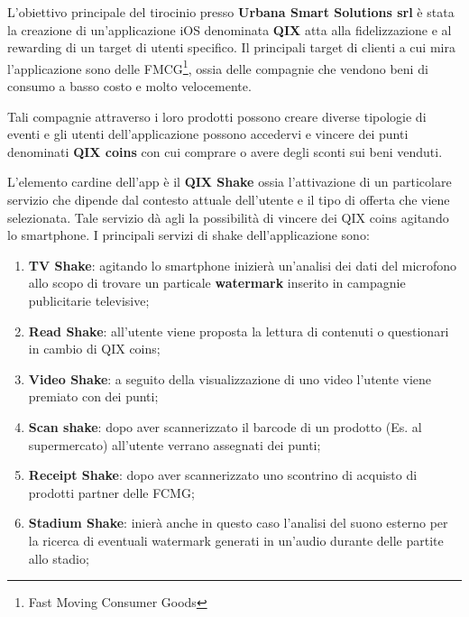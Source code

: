 \normalsize
L’obiettivo principale del tirocinio presso \textbf{Urbana Smart Solutions srl}\cite{urbanasmartsolutions}
è stata la creazione di un'applicazione
iOS denominata \textbf{QIX} atta alla fidelizzazione e al rewarding di un target di utenti specifico. 
Il principali target di clienti a cui mira l'applicazione sono delle FMCG\footnote{Fast Moving Consumer
Goods}, ossia delle compagnie che vendono beni di consumo a basso
costo e molto velocemente.

Tali compagnie attraverso i loro prodotti possono creare diverse
tipologie di eventi e gli utenti dell’applicazione possono accedervi
e vincere dei punti denominati \textbf{QIX coins} con cui comprare o avere degli
sconti sui beni venduti.


L’elemento cardine dell’app è il \textbf{QIX Shake} ossia l’attivazione di un particolare servizio
che dipende dal contesto attuale dell'utente e il tipo di offerta che viene selezionata.
Tale servizio dà agli la possibilità di vincere dei QIX coins agitando lo smartphone.
I principali servizi di shake dell'applicazione sono:

\begin{enumerate}
    \item\textbf{TV Shake}: agitando lo smartphone inizierà un'analisi dei dati del microfono
    allo scopo di trovare un particale \textbf{watermark} inserito in campagnie publicitarie televisive;
    \item\textbf{Read Shake}: all'utente viene proposta la lettura di contenuti o questionari in cambio di QIX coins;
    \item\textbf{Video Shake}: a seguito della visualizzazione di uno video l'utente viene premiato con dei punti;
    \item\textbf{Scan shake}: dopo aver scannerizzato il barcode di un prodotto (Es. al supermercato) all'utente verrano assegnati dei punti;
    \item\textbf{Receipt Shake}: dopo aver scannerizzato uno scontrino di acquisto di prodotti partner delle FCMG;
    \item\textbf{Stadium Shake}: inierà anche in questo caso l'analisi del suono esterno per la ricerca di eventuali watermark
    generati in un'audio durante delle partite allo stadio;
\end{enumerate}

